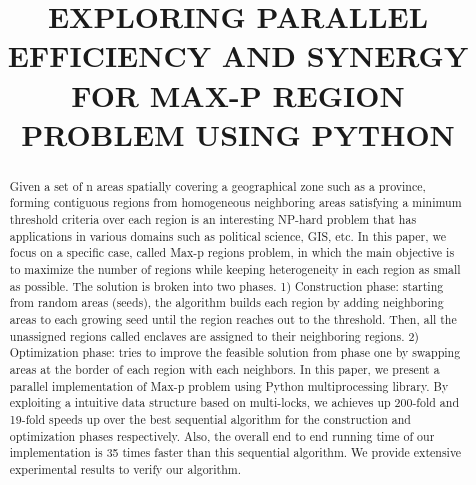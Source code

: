 \documentclass[conference]{IEEEtran}
\begin{document}
\title{EXPLORING PARALLEL EFFICIENCY AND SYNERGY FOR MAX-P REGION PROBLEM USING PYTHON\\
}

\author{
\and
{}
\and
{}
\and
{}
}

\maketitle

\begin{abstract}
Given a set of n areas spatially covering a geographical zone such as a
province, forming contiguous regions from homogeneous neighboring areas
satisfying a minimum threshold criteria over each region is an interesting
NP-hard problem that has applications in various domains such as political
science, GIS, etc. In this paper, we focus on a specific case, called Max-p
regions problem, in which the main objective is to maximize the number of regions while
keeping heterogeneity in each region as small as possible. The solution is
broken into two phases. 1) Construction phase: starting from random areas (seeds), the algorithm builds each region by adding neighboring areas to each
growing seed until the region reaches out to the threshold. Then, all the
unassigned regions called enclaves are assigned to their neighboring regions.
2) Optimization phase: tries to improve the feasible solution from phase one by swapping
areas at the border of each region with each neighbors. In this paper, we
present a parallel implementation of Max-p problem using Python multiprocessing
library. By exploiting a intuitive data structure based on multi-locks, we
achieves up 200-fold and 19-fold speeds up over the best sequential algorithm for
the construction and optimization phases respectively. Also, the overall end to
end running time of our implementation is 35 times faster than this sequential
algorithm. We provide extensive experimental results to verify our algorithm.
\end{abstract}
\end{document}
